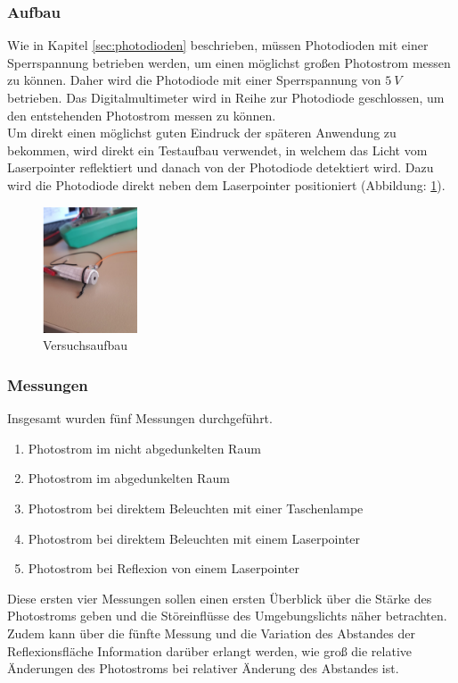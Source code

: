 \subsubsection{Aufbau}
Wie in Kapitel \ref{sec:photodioden} beschrieben, müssen Photodioden mit einer Sperrspannung betrieben werden, um einen möglichst großen Photostrom messen zu können. Daher wird die Photodiode mit einer Sperrspannung von $5\:V$ betrieben. Das Digitalmultimeter wird in Reihe zur Photodiode geschlossen, um den entstehenden Photostrom messen zu können.\\
Um direkt einen möglichst guten Eindruck der späteren Anwendung zu bekommen, wird direkt ein Testaufbau verwendet, in welchem das Licht vom Laserpointer reflektiert und danach von der Photodiode detektiert wird. Dazu wird die Photodiode direkt neben dem Laserpointer positioniert (Abbildung: \ref{versuch1_versuchsaufbau}). 
\begin{figure}[H]
	\centering
	\includegraphics[width=0.25\textwidth]{images/Machbarkeitsstudie/Versuch1_Aufbau}	
	\caption{Versuchsaufbau}
	\label{versuch1_versuchsaufbau}
\end{figure}
\subsubsection{Messungen}
Insgesamt wurden fünf Messungen durchgeführt.
\begin{enumerate}
	\item Photostrom im nicht abgedunkelten Raum
	\item Photostrom im abgedunkelten Raum
	\item Photostrom bei direktem Beleuchten mit einer Taschenlampe
	\item Photostrom bei direktem Beleuchten mit einem Laserpointer
	\item Photostrom bei Reflexion von einem Laserpointer
\end{enumerate}
Diese ersten vier Messungen sollen einen ersten Überblick über die Stärke des Photostroms geben und die Störeinflüsse des Umgebungslichts näher betrachten. Zudem kann über die fünfte Messung und die Variation des Abstandes der Reflexionsfläche Information darüber erlangt werden, wie groß die relative Änderungen des Photostroms bei relativer Änderung des Abstandes ist.
